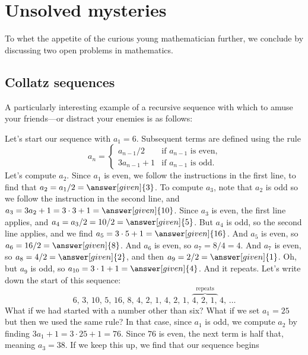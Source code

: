 \documentclass{ximera}
\begin{document}
\section{Unsolved mysteries}

To whet the appetite of the curious young mathematician further, we conclude by discussing two open problems in mathematics.

\subsection{Collatz sequences}

A particularly interesting example of a recursive sequence with which to amuse your friends---or distract
your enemies is as follows:

\begin{example}
  Let's start our sequence with $a_1 = 6$.  Subsequent terms are
  defined using the rule
  \[
  a_n =
  \begin{cases}
    a_{n-1} / 2 &\text{if $a_{n-1}$ is even,} \\
    3a_{n-1} + 1 &\text{if $a_{n-1}$ is odd.}
  \end{cases}
  \]
  Let's compute $a_2$.  Since $a_1$ is even, we follow the
  instructions in the first line, to find that $a_2 = a_1/2 =
  \answer[given]{3}$. To compute $a_3$, note that $a_2$ is odd so we
  follow the instruction in the second line, and $a_3 = 3 a_2 + 1 = 3
  \cdot 3 + 1 = \answer[given]{10}$.  Since $a_3$ is even, the first
  line applies, and $a_4 = a_3 / 2 = 10 / 2 = \answer[given]{5}$.  But
  $a_4$ is odd, so the second line applies, and we find $a_5 = 3 \cdot
  5 + 1 = \answer[given]{16}$.  And $a_5$ is even, so $a_6 = 16 / 2 =
  \answer[given]{8}$.  And $a_6$ is even, so $a_7 = 8/4 = 4$.  And
  $a_7$ is even, so $a_8 = 4 / 2 = \answer[given]{2}$, and then $a_9 =
  2/2 = \answer[given]{1}$.  Oh, but $a_9$ is odd, so $a_{10} = 3
  \cdot 1 + 1 = \answer[given]{4}$.  And it repeats.  Let's write down
  the start of this sequence:
  \[
  6,\, %
  3,\, %
  10,\,  %
  5,\,  %
  16,\,  %
  8,\,  %
  4,\,  %
  2,\,  %
  1,\,  %
  4,\, %
  2,\, %
  1,\, %
  \overbrace{4,\, %
    2,\, %
    1,}^{\text{repeats}}\, %
  4,\, %
  \ldots
  \]
  What if we had started with a number other than six?  What if we set
  $a_1 = 25$ but then we used the same rule?  In that case, since
  $a_1$ is odd, we compute $a_2$ by finding $3 a_1 + 1 = 3 \cdot 25 +
  1 = 76$.  Since $76$ is even, the next term is half that, meaning
  $a_3 = 38$.  If we keep this up, we find that our sequence begins

\end{example}
\end{document}
